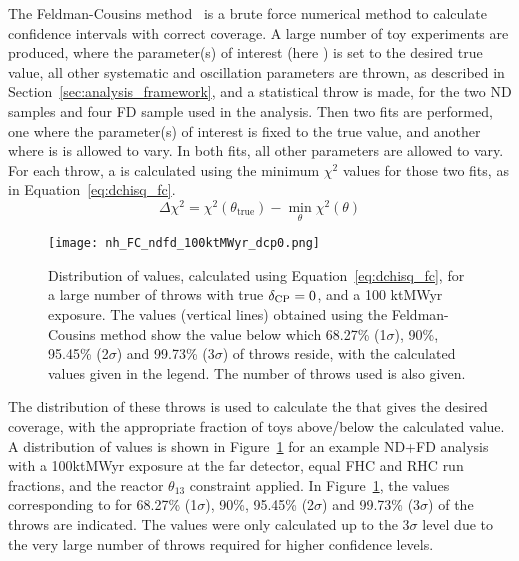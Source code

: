 The Feldman-Cousins method~\cite{Feldman:1997qc} is a brute force numerical method to calculate confidence intervals with correct coverage. A large number of toy experiments are produced, where the parameter(s) of interest (here \deltacp) is set to the desired true value, all other systematic and oscillation parameters are thrown, as described in Section~\ref{sec:analysis_framework}, and a statistical throw is made, for the two ND samples and four FD sample used in the analysis. Then two fits are performed, one where the parameter(s) of interest is fixed to the true value, and another where is is allowed to vary. In both fits, all other parameters are allowed to vary. For each throw, a \dchisq is calculated using the minimum $\chi^{2}$ values for those two fits, as in Equation~\ref{eq:dchisq_fc}.
\begin{equation}
  \Delta\chi^{2} = \chi^{2}(\theta_{\mathrm{true}}) - \min_{\theta}\chi^{2}(\theta)
  \label{eq:dchisq_fc}
\end{equation}
\begin{figure}[htbp]
  \centering
  \texttt{[image: nh\_FC\_ndfd\_100ktMWyr\_dcp0.png]}
  \caption{Distribution of \dchisq values, calculated using Equation~\ref{eq:dchisq_fc}, for a large number of throws with true $\delta_{\rm CP} = 0$, and a 100 ktMWyr exposure. The \dchisqcrit values (vertical lines) obtained using the Feldman-Cousins method show the \dchisq value below which 68.27\% (1$\sigma$), 90\%, 95.45\% (2$\sigma$) and 99.73\% (3$\sigma$) of throws reside, with the calculated values given in the legend. The number of throws used is also given.}
  \label{fig:fc_throws}
\end{figure}
The distribution of these throws is used to calculate the \dchisqcrit that gives the desired coverage, with the appropriate fraction of toys above/below the calculated value. A distribution of \dchisq values is shown in Figure~\ref{fig:fc_throws} for an example ND+FD analysis with a 100ktMWyr exposure at the far detector, equal FHC and RHC run fractions, and the reactor $\theta_{13}$ constraint applied. In Figure~\ref{fig:fc_throws}, the \dchisqcrit values corresponding to for 68.27\% (1$\sigma$), 90\%, 95.45\% (2$\sigma$) and 99.73\% (3$\sigma$) of the throws are indicated. The \dchisqcrit values were only calculated up to the 3$\sigma$ level due to the very large number of throws required for higher confidence levels.

